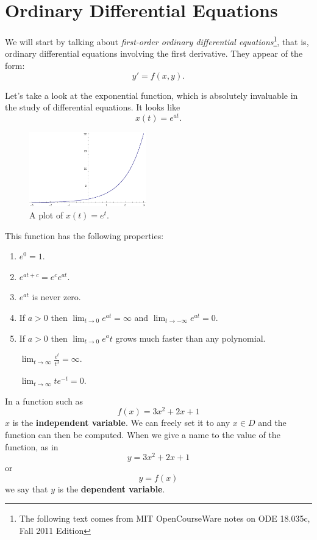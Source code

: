 \chapter{Ordinary Differential Equations}
We will start by talking about \emph{first-order ordinary differential equations}\footnote{The following text comes from MIT OpenCourseWare notes on ODE 18.035c, Fall 2011 Edition},
that is, ordinary differential equations involving the first derivative.
They appear of the form:
\begin{equation}
  y'=f(x,y).
  \label{eq:fode}
\end{equation}

Let's take a look at the exponential function, which is absolutely invaluable in the study of differential equations.
It looks like
\[ x(t)=e^{at}. \]
\begin{figure}[H]
  \begin{center}
    \includegraphics[width=2in]{continuous/ode/ept.eps}
  \end{center}
  \caption{A plot of $x(t)=e^t$.}
  \label{fig:plotept}
\end{figure}
This function has the following properties:
\begin{enumerate}
  \item $e^0 =1$.
  \item $e^{at+c} = e^c e^{at}$.
  \item $e^{at}$ is never zero.
  \item If $a>0$ then $\lim_{t\to 0} e^{at} = \infty$ and $\lim_{t\to -\infty} e^{at}=0$.
  \item If $a>0$ then $\lim_{t\to 0} e^at$ grows much faster than any polynomial.
    \begin{ex}
      $\lim_{t\to\infty} \frac{e^t}{t^3}=\infty$.
    \end{ex}
    \begin{ex}
      $\lim_{t\to\infty}te^{-t}=0.$
    \end{ex}
\end{enumerate}

In a function such as
\[ f(x)=3x^2+2x+1 \]
$x$ is the \textbf{independent variable}.
We can freely set it to any $x \in D$ and the function can then be computed.
When we give a name to the value of the function, as in
\[ y=3x^2 +2x +1 \]
or
\[y=f(x) \]
we say that $y$ is the \textbf{dependent variable}.

